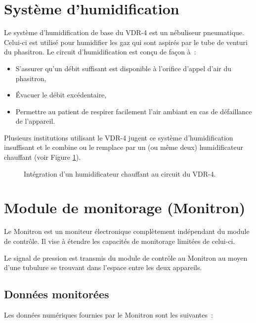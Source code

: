\section{Système d’humidification}

Le système d’humidification de base du VDR-4 est un nébuliseur pneumatique.
Celui-ci est utilisé pour humidifier les gaz qui sont aspirés par le tube de
venturi du phasitron. Le circuit d’humidification est conçu de façon à :

\begin{itemize}
	\item S’assurer qu’un débit suffisant est disponible à l’orifice d’appel d’air du phasitron,
	\item Évacuer le débit excédentaire,
	\item Permettre au patient de respirer facilement l’air ambiant en cas de défaillance de l’appareil.
\end{itemize}

Plusieurs institutions utilisant le VDR-4 jugent ce système 
d’humidification insuffisant et le combine ou le remplace par un 
(ou même deux) humidificateur chauffant (voir Figure \ref{fig:circuit}).


\begin{figure}
	
	\label{fig:circuit}
	\caption{Intégration d'un humidificateur chauffant au circuit du VDR-4.}
\end{figure}

\section{Module de monitorage (Monitron)}

Le Monitron est un moniteur électronique complètement indépendant du module de
contrôle. Il vise à étendre les capacités de monitorage limitées de celui-ci.

Le signal de pression est transmis du module de contrôle au Monitron au moyen
d’une tubulure se trouvant dans l’espace entre les deux appareils.

\subsection{Données monitorées}

Les données numériques fournies par le Monitron sont les suivantes :

